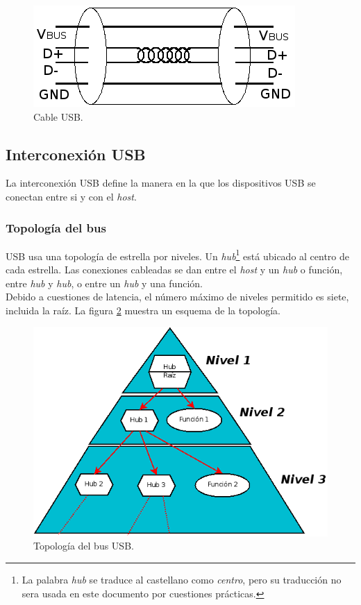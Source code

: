 \begin{figure}
\centering
\includegraphics[scale=0.5]{./img/electric_usb.png}
\caption{Cable USB.}
\label{fig:electric_usb}
\end{figure}


\subsection{Interconexi\'on USB}

La interconexi\'on USB define la manera en la que los dispositivos USB se
conectan entre si y con el \emph{host}. 

\subsubsection{Topolog\'ia del bus}

USB usa una topolog\'ia de estrella por niveles. Un \emph{hub}\footnote{La
palabra \emph{hub} se traduce al castellano como \emph{centro}, pero su
traducci\'on no sera usada en este documento por cuestiones pr\'acticas.}
est\'a ubicado al centro de cada estrella. Las conexiones cableadas se dan
entre el \emph{host} y un \emph{hub} o funci\'on, entre \emph{hub} y
\emph{hub}, o entre un \emph{hub} y una funci\'on. \\

Debido a cuestiones de latencia, el n\'umero m\'aximo de niveles permitido es
siete, incluida la ra\'iz. La figura \ref{fig:usb_topology} muestra un esquema
de la topolog\'ia.

\begin{figure}
\centering
\includegraphics[scale=0.5]{./img/usb_topology.png}
\caption{Topolog\'ia del bus USB.}
\label{fig:usb_topology}
\end{figure}

